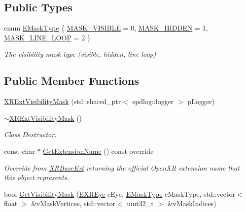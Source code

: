 \subsection*{Public Types}
\begin{DoxyCompactItemize}
\item 
enum \mbox{\hyperlink{class_open_x_r_provider_1_1_x_r_ext_visibility_mask_a80c9de64fb067663f183e0b36a819b41}{E\+Mask\+Type}} \{ \mbox{\hyperlink{class_open_x_r_provider_1_1_x_r_ext_visibility_mask_a80c9de64fb067663f183e0b36a819b41a629db3f30b899c37ebf19918d30613cb}{M\+A\+S\+K\+\_\+\+V\+I\+S\+I\+B\+LE}} = 0, 
\mbox{\hyperlink{class_open_x_r_provider_1_1_x_r_ext_visibility_mask_a80c9de64fb067663f183e0b36a819b41a062fb7c54994a14383b061d451ecff35}{M\+A\+S\+K\+\_\+\+H\+I\+D\+D\+EN}} = 1, 
\mbox{\hyperlink{class_open_x_r_provider_1_1_x_r_ext_visibility_mask_a80c9de64fb067663f183e0b36a819b41a07b15a3130a6be88c659bfdcd9065ff0}{M\+A\+S\+K\+\_\+\+L\+I\+N\+E\+\_\+\+L\+O\+OP}} = 2
 \}
\begin{DoxyCompactList}\small\item\em The visibility mask type (visible, hidden, line-\/loop) \end{DoxyCompactList}\end{DoxyCompactItemize}
\subsection*{Public Member Functions}
\begin{DoxyCompactItemize}
\item 
\mbox{\hyperlink{class_open_x_r_provider_1_1_x_r_ext_visibility_mask_abd25bf0e035d9322df864ca3a87996ca}{X\+R\+Ext\+Visibility\+Mask}} (std\+::shared\+\_\+ptr$<$ spdlog\+::logger $>$ p\+Logger)
\item 
\mbox{\hyperlink{class_open_x_r_provider_1_1_x_r_ext_visibility_mask_a868e9fcab3dd68d76fd94d14fcedada2}{$\sim$\+X\+R\+Ext\+Visibility\+Mask}} ()
\begin{DoxyCompactList}\small\item\em Class Destructor. \end{DoxyCompactList}\item 
const char $\ast$ \mbox{\hyperlink{class_open_x_r_provider_1_1_x_r_ext_visibility_mask_a7560c4d28687a01f8b7ef80107d09b20}{Get\+Extension\+Name}} () const override
\begin{DoxyCompactList}\small\item\em Override from \mbox{\hyperlink{class_open_x_r_provider_1_1_x_r_base_ext}{X\+R\+Base\+Ext}} returning the official Open\+XR extension name that this object represents. \end{DoxyCompactList}\item 
bool \mbox{\hyperlink{class_open_x_r_provider_1_1_x_r_ext_visibility_mask_abba0f5bc2a79600d137ee98941865947}{Get\+Visibility\+Mask}} (\mbox{\hyperlink{namespace_open_x_r_provider_a8aa379869e30772896e6c468eb54f155}{E\+X\+R\+Eye}} e\+Eye, \mbox{\hyperlink{class_open_x_r_provider_1_1_x_r_ext_visibility_mask_a80c9de64fb067663f183e0b36a819b41}{E\+Mask\+Type}} e\+Mask\+Type, std\+::vector$<$ float $>$ \&v\+Mask\+Vertices, std\+::vector$<$ uint32\+\_\+t $>$ \&v\+Mask\+Indices)
\end{DoxyCompactItemize}
